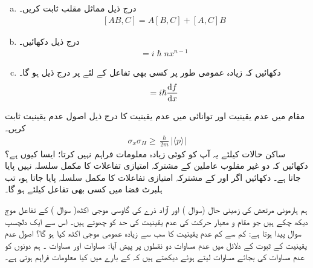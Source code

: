 \begin{enumerate}[a.]
\item
 درج ذیل مماثل مقلب ثابت کریں۔
\begin{align}\label{مساوات_قواعد_ایک_مقالب_مماثل}
[ AB,C ] = A[B,C] + [A,C]B
\end{align}
\item
 درج ذیل دکھائیں۔ 
\begin{align*}
[x^{n},p] = i\hslash nx^{n-1}
\end{align*}
\item
 دکھائیں کہ زیادہ عمومی طور پر کسی بھی تفاعل  کے لئے پر درج ذیل ہو گا۔ 
\begin{align}
[f(x) , p] = i\hslash \frac{\dif f}{\dif x}
\end{align}
\end{enumerate}
مقام  میں عدم یقینیت اور توانائی  میں عدم یقینیت کا درج ذیل اصول عدم یقینیت ثابت کریں۔
\begin{align*}
\sigma_{x}\sigma_{H} \geq \frac{\hslash}{2m}|\langle p \rangle |
\end{align*}
ساکن حالات کیلئے یہ آپ کو کوئی زیادہ معلومات فراہم نہیں کرتا؛ ایسا کیوں ہے؟
دکھائیں کہ دو غیر مقلوب عاملین کے مشترکہ امتیازی تفاعلات کا مکمل سلسلہ نہیں پایا جاتا ہے۔
 دکھائیں اگر  اور  کے مشترکہ امتیازی تفاعلات کا مکمل سلسلہ پایا جاتا ہو، تب ہلبرٹ فضا میں کسی بھی تفاعل کیلئے  ہو گا۔


ہم ہارمونی مرتعش کی زمینی حال (سوال ) اور آزاد ذرے کی گاوسی موجی اکٹھ( سوال ) کے تفاعل موج دیکھ چکے ہیں جو مقام و معیار حرکت کی عدم یقینیت کی
 حد  کو چھوتے ہیں۔ اس سے ایک دلچسپ سوال پیدا ہوتا ہے: کم سے کم عدم یقینیت کا سب سے زیادہ عمومی موجی اکٹھ کیا ہو گا؟ اصول عدم یقینیت کے ثبوت کے دلائل میں عدم مساوات دو نقطوں پر پیش آیا: مساوات  اور مساوات ۔ ہم دونوں کو عدم مساوات کی بجائے مساوات لیتے ہوئے دیکھتے ہیں کہ  کے بارے میں کیا معلومات فراہم ہوتی ہے۔
 
